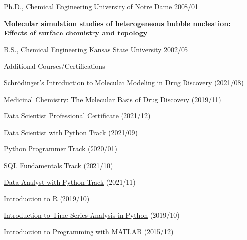 
\begin{cventries}
  \cventry
    {Ph.D., Chemical Engineering} %
    {University of Notre Dame} %
    {} %
    {2008/01} %
    {
      \begin{cvitems} %
         \item {\textbf{Molecular simulation studies of heterogeneous bubble nucleation: Effects of surface chemistry and topology}}
      \end{cvitems}
    }
    
    \cventry
      {B.S., Chemical Engineering}
      {Kansas State University}
      {}
      {2002/05}
      {}

  \vspace{-10pt}
      
  \cventry
    {}
    {Additional Courses/Certifications}
    {}
    {}
    {
        \begin{cvitems}
            \item{\href{https://api.badgr.io/public/assertions/zZ7-bHnkTcm6H_UNr2s-LA}{Schrödinger's Introduction to Molecular Modeling in Drug Discovery} (2021/08)}           
            \item{\href{https://courses.edx.org/certificates/27307d91954041dab94af0ff554bc378}{Medicinal Chemistry: The Molecular Basis of Drug Discovery} (2019/11)}
            \item{\href{https://www.datacamp.com/certificate/DS0010628355005}{Data Scientist Professional Certificate} (2021/12)}            
            \item{\href{https://www.datacamp.com/statement-of-accomplishment/track/2bb866790e6f6cda38fbc31ede0fb670e8c3bd5e}{Data Scientist with Python Track} (2021/09)}
            \item{\href{https://www.datacamp.com/statement-of-accomplishment/track/546928503f3ccea8a2ef53a6040f43997381f967}{Python Programmer Track} (2020/01)}
            \item{\href{https://www.datacamp.com/statement-of-accomplishment/track/941904e6394e2951693441d466f4643e5edfb4de}{SQL Fundamentals Track} (2021/10)}
            \item{\href{https://www.datacamp.com/statement-of-accomplishment/track/58a2874f38ce2a5127d0f39e7a4d5ee36bf86349}{Data Analyst with Python Track} (2021/11)}
            \item{\href{https://www.datacamp.com/statement-of-accomplishment/course/dd5746b9564cf374bcc0bb379e1801925e25259e}{Introduction to R} (2019/10)}
            \item{\href{https://www.datacamp.com/statement-of-accomplishment/course/807548ea866063da3c0083afcebf3be48d44f277}{Introduction to Time Series Analysis in Python} (2019/10)}
            \item {\href{https://www.coursera.org/account/accomplishments/verify/9G7V69L6QP}{Introduction to Programming with MATLAB} (2015/12)}
        \end{cvitems}      
    }

\end{cventries}
